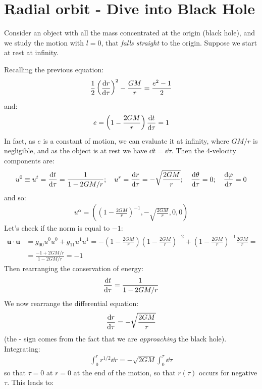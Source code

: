 \documentclass[../template.tex]{subfiles}
\begin{document}
\section{Radial orbit - Dive into Black Hole}
Consider an object with all the mass concentrated at the origin (black hole), and we study the motion with $l=0$, that \textit{falls straight} to the origin. Suppose we start at rest at infinity. 

Recalling the previous equation:
\begin{align*}
    \frac{1}{2}\left(\dv{r}{\tau}\right)^2 - \frac{GM}{r} = \frac{e^2-1}{2}  
\end{align*}
and:
\begin{align*}
    e = \left(1-\frac{2GM}{r} \right)\dv{t}{\tau} = 1
\end{align*}
In fact, as $e$ is a constant of motion, we can evaluate it at infinity, where $GM/r$ is negligible, and as the object is at rest we have $\dd{t} = \dd{\tau}$.  
Then the $4$-velocity components are: 
\begin{align*}
    u^0 \equiv u^t = \dv{t}{\tau} = \frac{1}{1- 2GM/r}; \quad u^r = \dv{r}{\tau} = -\sqrt{\frac{2GM}{r} }; \quad \dv{\theta}{\tau} = 0; \quad \dv{\varphi}{\tau} = 0
\end{align*}
and so:
\begin{align*}
    u^\alpha = \left(\left(1-\frac{2GM}{r} \right)^{-1}, -\sqrt{\frac{2GM}{r} }, 0, 0\right)
\end{align*}
Let's check if the norm is equal to $-1$:
\begin{align*}
    \bm{u}\cdot \bm{u} &= g_{00} u^0 u^0 + g_{11} u^1 u^1 = -\left(1-\frac{2GM}{r} \right)(1-\frac{2GM}{r} )^{-2} + \left(1-\frac{2GM}{r} \right)^{-1} \frac{2GM}{r} =\\
    &= \frac{-1 + 2GM/r}{1-2GM/r} = -1 
\end{align*}
Then rearranging the conservation of energy:
\begin{align*}
    \dv{t}{\tau} = \frac{1}{1- 2GM/r} 
\end{align*}
We now rearrange the differential equation:
\begin{align*}
    \dv{r}{\tau} = - \sqrt{\frac{2GM}{r} }
\end{align*}
(the - sign comes from the fact that we are \textit{approaching} the black hole). Integrating:
\begin{align*}
    \int_0^r r^{1/2} \dd{r} = -\sqrt{2GM} \int_0^\tau \dd{\tau}
\end{align*}
so that $\tau = 0$ at $r=0$ at the end of the motion, so that $r(\tau)$ occurs for negative $\tau$. This leads to:
\end{document}
